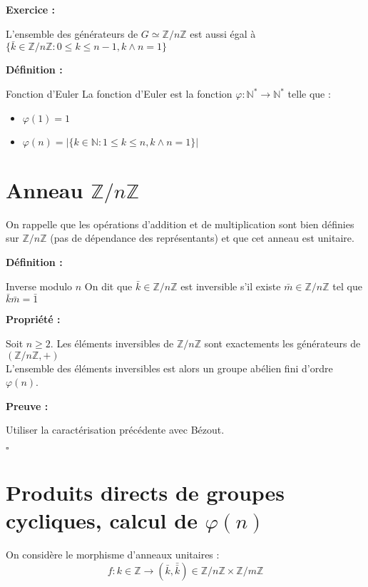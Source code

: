 \documentclass{report}
\renewenvironment{leftbar}{%
  \def\FrameCommand{\vrule width 0.4pt \hspace{10pt}}%
  \MakeFramed {\advance\hsize-\width \FrameRestore}}%
 {\endMakeFramed}%
\newenvironment{definition}[1][]{
    \begin{tcolorbox}[colframe= white]
    \textbf{Définition :} 
    #1 \par
    }
    {\end{tcolorbox}}
\newenvironment{preuve}{\vspace*{0.5cm}
    \begin{leftbar}
    \noindent\textbf{Preuve :}\par}{
    \begin{flushright}
    $\square$
    \end{flushright}
    \end{leftbar}
}
\newenvironment{prop}{\begin{tcolorbox}[colframe= white]
    \textbf{Propriété :}
     \par}
    {\end{tcolorbox}}
\newenvironment{exo}{\begin{tcolorbox}[colframe= white]
    \textbf{Exercice :}
    \par}
    {\end{tcolorbox}}
\begin{document}
\begin{exo}
	L'ensemble des générateurs de $G \simeq \mathbb{Z}/n\mathbb{Z}$ est aussi égal à $\{\bar{k} \in \mathbb{Z}/n\mathbb{Z} : 0 \leq k \leq n-1, k \wedge n =1\}$
\end{exo}

\begin{definition}{Fonction d'Euler}
	La fonction d'Euler est la fonction $\varphi : \mathbb{N}^* \rightarrow \mathbb{N}^*$ telle que :
\begin{itemize}
\item $\varphi (1) = 1$ 
\item $\varphi (n) = | \{k \in \mathbb{N} : 1 \leq k \leq n, k \wedge n =1 \}|$
		
\end{itemize}
\end{definition}




\section{\texorpdfstring{Anneau $\mathbb{Z}/n\mathbb{Z}$}{Anneau Z/nZ}}

On rappelle que les opérations d'addition et de multiplication sont bien définies sur $\mathbb{Z}/n\mathbb{Z}$ (pas de dépendance des représentants) et que cet anneau est unitaire. 

\begin{definition}{Inverse modulo $n$}
On dit que $\bar{k}\in \mathbb{Z}/n\mathbb{Z}$ est inversible s'il existe $\bar{m} \in \mathbb{Z}/n\mathbb{Z}$ tel que $\bar{k}\bar{m}=\bar{1}$
\end{definition}

\begin{prop}
	Soit $n \geq 2$. Les éléments inversibles de $\mathbb{Z}/n\mathbb{Z}$ sont exactements les générateurs de $\left (\mathbb{Z}/n\mathbb{Z}, + \right)$ \\
	L'ensemble des éléments inversibles est alors un groupe abélien fini d'ordre $\varphi (n)$.
\end{prop}
\begin{preuve}
	Utiliser la caractérisation précédente avec Bézout.
\end{preuve}

\section{\texorpdfstring{Produits directs de groupes cycliques, calcul de $\varphi (n)$}{Produits, directs de groupes cycliques, indicatrice d'Euler}}
On considère le morphisme d'anneaux unitaires : $$f : k\in \mathbb{Z} \to (\bar{k}, \bar{\bar{k}}) \in \mathbb{Z}/n\mathbb{Z} \times \mathbb{Z}/m\mathbb{Z}$$
\end{document}
